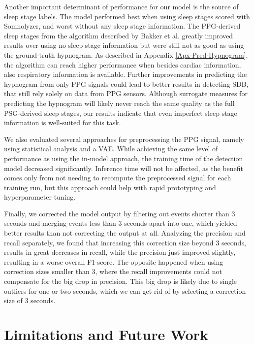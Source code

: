 Another important determinant of performance for our model is the source of sleep stage labels. The model performed best when using sleep stages scored with Somnolyzer, and worst without any sleep stage information. The PPG-derived sleep stages from the algorithm described by Bakker et al. \cite{bakker2021estimating} greatly improved results over using no sleep stage information but were still not as good as using the ground-truth hypnogram. As described in Appendix \ref{Apx-Pred-Hypnogram}, the algorithm can reach higher performance when besides cardiac information, also respiratory information is available. Further improvements in predicting the hypnogram from only PPG signals could lead to better results in detecting SDB, that still rely solely on data from PPG sensors.
Although surrogate measures for predicting the hypnogram will likely never reach the same quality as the full PSG-derived sleep stages, our results indicate that even imperfect sleep stage information is well-suited for this task.

We also evaluated several approaches for preprocessing the PPG signal, namely using statistical analysis and a VAE. While achieving the same level of performance as using the in-model approach, the training time of the detection model decreased significantly. Inference time will not be affected, as the benefit comes only from not needing to recompute the preprocessed signal for each training run, but this approach could help with rapid prototyping and hyperparameter tuning.

Finally, we corrected the model output by filtering out events shorter than 3 seconds and merging events less than 3 seconds apart into one, which yielded better results than not correcting the output at all.
Analyzing the precision and recall separately, we found that increasing this correction size beyond 3 seconds, results in great decreases in recall, while the precision just improved slightly, resulting in a worse overall F1-score. The opposite happened when using correction sizes smaller than 3, where the recall improvements could not compensate for the big drop in precision. This big drop is likely due to single outliers for one or two seconds, which we can get rid of by selecting a correction size of 3 seconds.

\section{Limitations and Future Work}


